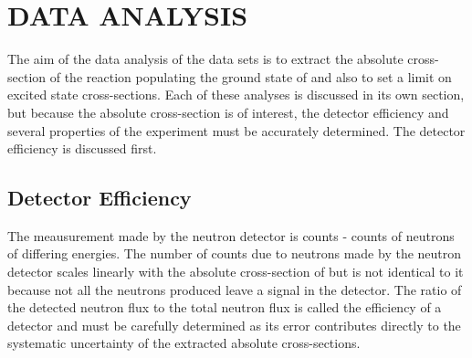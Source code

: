 %
%
%
%
%
%
%
%

%
%

\chapter{DATA ANALYSIS}
\label{chap:dataAnalysis}

The aim of the data analysis of the \reaction data sets is to extract the absolute cross-section of the reaction populating the ground state of \GeTargets and also to set a limit on excited \zp state cross-sections.  Each of these analyses is discussed in its own section, but because the absolute cross-section is of interest, the detector efficiency and several properties of the experiment must be accurately determined.  The detector efficiency is discussed first.

\section{Detector Efficiency}

The meausurement made by the neutron detector is counts - counts of neutrons of differing energies.  The number of counts due to neutrons made by the neutron detector scales linearly with the absolute cross-section of \reaction but is not identical to it because not all the neutrons produced leave a signal in the detector.  The ratio of the detected neutron flux to the total neutron flux is called the efficiency of a detector and must be carefully determined as its error contributes directly to the systematic uncertainty of the extracted absolute cross-sections.


